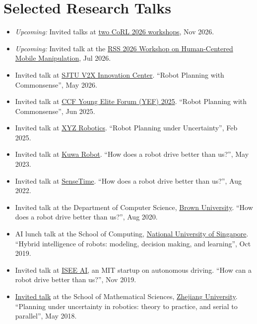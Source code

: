 \documentclass[10pt,letterpaper,sans]{moderncv}
\begin{document}
\section{Selected Research Talks}
\begin{itemize}
  \item \emph{Upcoming:} Invited talks at \underline{two CoRL 2026 workshops}, Nov 2026.
  \item \emph{Upcoming:} Invited talk at the \underline{RSS 2026 Workshop on Human-Centered Mobile Manipulation}, Jul 2026.
  \item Invited talk at \underline{SJTU V2X Innovation Center}. ``Robot Planning with Commonsense'', May 2026.
  \item Invited talk at \underline{CCF Young Elite Forum (YEF) 2025}. ``Robot Planning with Commonsense'', Jun 2025.
  \item Invited talk at \underline{XYZ Robotics}. ``Robot Planning under Uncertainty'', Feb 2025.
  \item Invited talk at \underline{Kuwa Robot}. ``How does a robot drive better than us?'', May 2023.
  \item Invited talk at \underline{SenseTime}. ``How does a robot drive better than us?'', Aug 2022.
  \item Invited talk at the Department of Computer Science, \underline{Brown University}. ``How does a robot drive better than us?'', Aug 2020.
  \item AI lunch talk at the School of Computing, \underline{National University of Singapore}. ``Hybrid intelligence of robots: modeling, decision making, and learning'', Oct 2019.
  \item Invited talk at \href{https://www.isee.ai/}{\underline{ISEE AI}}, an MIT startup on autonomous driving. ``How can a robot drive better than us?'', Nov 2019.
  \item \href{http://www.math.zju.edu.cn/mathen/2018/0509/c38278a1596436/page.htm}{Invited talk} at the School of Mathematical Sciences, \underline{Zhejiang University}. ``Planning under uncertainty in robotics: theory to practice, and serial to parallel'', May 2018.
\end{itemize}
\end{document}
